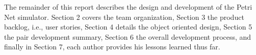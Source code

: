 
The remainder of this report describes the design and development of the Petri Net simulator.
Section 2 covers the team organization, Section 3 the product backlog, i.e., user stories,
Section 4 details the object oriented design, Section 5 the pair development summary, Section 6
the overall development process, and finally in Section 7, each author provides his lessons
learned thus far.


